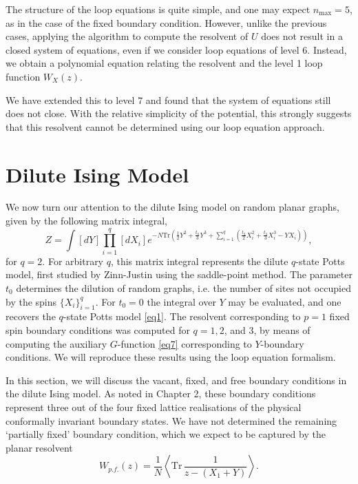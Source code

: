 The structure of the loop equations is quite simple, and one may expect $n_{\text{max}}=5$, as in
the case of the fixed boundary condition. However, unlike the previous cases, applying the
algorithm to compute the resolvent of $U$ does not result in a closed system of equations, even if
we consider loop equations of level 6. Instead, we obtain a polynomial equation relating the
resolvent and the level 1 loop function $W_{X}(z)$.

We have extended this to level 7 and found that the system of equations still does not close. With
the relative simplicity of the potential, this strongly suggests that this resolvent cannot be
determined using our loop equation approach.

\section{Dilute Ising Model}

We now turn our attention to the dilute Ising model on random planar graphs, given by the following
matrix integral,
%
\begin{equation}
    \label{diluteQ}
    Z = \int [dY] \prod_{i=1}^q [dX_i] e^{-N\text{Tr}\left( \frac{1}{2}Y^2 + \frac{t_0}{3} Y^3 + \sum_{i=1}^q \left(\frac{t_2}{2} X_i^2 + \frac{t_3}{3} X_i^3 - Y X_i\right) \right)},
\end{equation}
%
for $q=2$. For arbitrary $q$, this matrix integral represents the dilute $q$-state Potts model,
first studied by Zinn-Justin \cite{ZinnJustin:1999jg} using the saddle-point method. The parameter
$t_0$ determines the dilution of random graphs, i.e. the number of sites not occupied by the spins
$\{X_i\}_{i=1}^q$. For $t_0=0$ the integral over $Y$ may be evaluated, and one recovers the
$q$-state Potts model \eqref{eq1}. The resolvent corresponding to $p=1$ fixed spin boundary
conditions was computed for $q=1,2$, and $3$, by means of computing the auxiliary $G$-function
\eqref{eq7} corresponding to $Y$-boundary conditions. We will reproduce these results using the
loop equation formalism.

In this section, we will discuss the vacant, fixed, and free boundary conditions in the dilute
Ising model. As noted in Chapter 2, these boundary conditions represent three out of the four fixed
lattice realisations of the physical conformally invariant boundary states. We have not determined
the remaining `partially fixed' boundary condition, which we expect to be captured by the planar
resolvent
%
\begin{equation}
    W_{p.f.}(z) = \frac{1}{N} \left\langle \text{Tr}\, \frac{1}{z-(X_1 + Y)}\right\rangle.
\end{equation}

